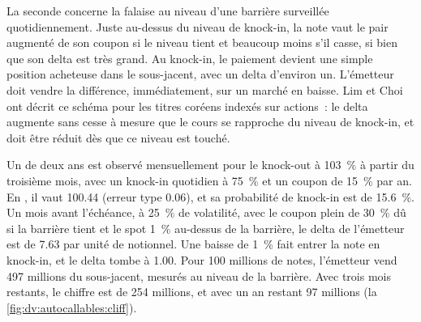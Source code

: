 La seconde concerne la falaise au niveau d'une barrière surveillée quotidiennement. Juste au-dessus du niveau de knock-in, la note vaut le pair augmenté de son coupon si le
niveau tient et beaucoup moins s'il casse, si bien que son delta est très grand. Au knock-in, le paiement devient une simple position acheteuse dans le
sous-jacent, avec un delta d'environ un. L'émetteur doit vendre la différence, immédiatement, sur un marché en baisse. Lim et Choi ont décrit
ce schéma pour les titres coréens indexés sur actions~: le delta augmente sans cesse à mesure que le cours se rapproche du niveau de knock-in, et doit
être réduit dès que ce niveau est touché.

\begin{example}\label{ex:dv:autocallables:cliff}
Un  de deux ans est observé mensuellement pour le knock-out à 103~\% à partir du troisième mois, avec un knock-in quotidien à 75~\% et un coupon de
15~\% par an. En , il vaut 100.44 (erreur type 0.06), et sa probabilité de knock-in est de 15.6~\%. Un mois
avant l'échéance, à 25~\% de volatilité, avec le coupon plein de 30~\% dû si la barrière tient et le spot 1~\% au-dessus de la barrière, le
delta de l'émetteur est de 7.63 par unité de notionnel. Une baisse de 1~\% fait entrer la note en knock-in, et le delta tombe à 1.00. Pour 100 millions de notes, l'émetteur
vend 497 millions du sous-jacent, mesurés au niveau de la barrière. Avec trois mois restants, le chiffre est de 254 millions, et avec un
an restant 97 millions (la \cref{fig:dv:autocallables:cliff}).
\end{example}

